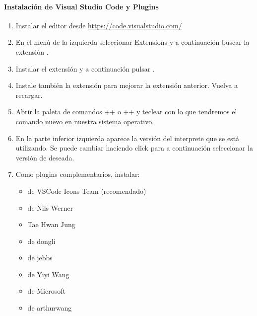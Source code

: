 \paragraph{Instalación de Visual Studio Code y Plugins}


\begin{enumerate}
\item Instalar el editor desde \url{https://code.visualstudio.com/}

\item En el menú de la izquierda seleccionar Extensions y a continuación buscar la extensión .

\item Instalar el extensión  y a continuación pulsar .

\item Instale también la extensión  para mejorar la extensión anterior. Vuelva a recargar.

\item Abrir la paleta de comandos \keys{\cmd}+\keys{\shift}+ o \keys{\ctrlwin}+\keys{\shift}+ y teclear  con lo que tendremos el comando nuevo  en nuestra sistema operativo.

\item En la parte inferior izquierda aparece la versión del interprete  que se está utilizando. Se puede cambiar haciendo click para a continuación seleccionar la versión de  deseada.

\item Como plugins complementarios, instalar:
	\begin{itemize}
	\item {} de VSCode Icons Team (recomendado)
	\item {} de Nils Werner
	\item {} Tae Hwan Jung
	\item {} de dongli
	\item {} de jebbs
	\item {} de Yiyi Wang
	\item {} de Microsoft
	\item {} de arthurwang
	\end{itemize}
	
\end{enumerate}




